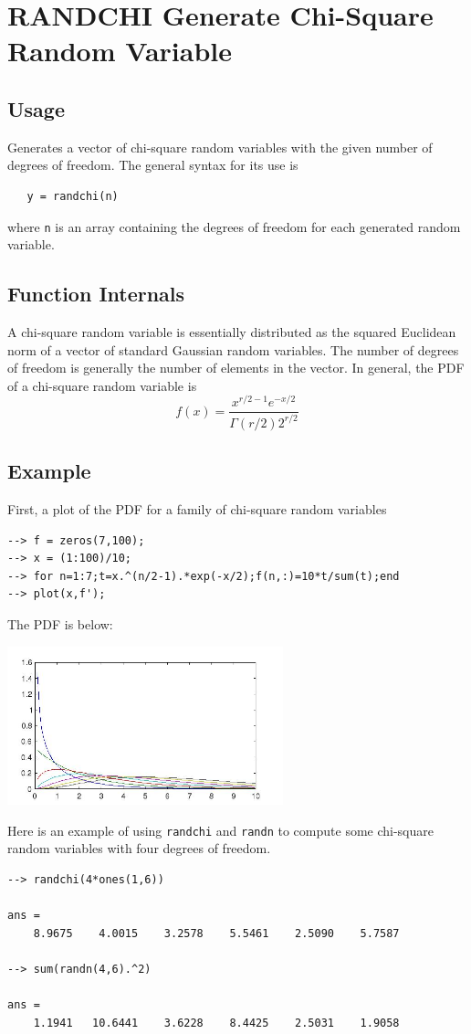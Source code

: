 \section{RANDCHI Generate Chi-Square Random Variable}

\subsection{Usage}

Generates a vector of chi-square random variables with the
given number of degrees of freedom.  The general syntax for
its use is 
\begin{verbatim}
   y = randchi(n)
\end{verbatim}
where \verb|n| is an array containing the degrees of freedom for
each generated random variable.
\subsection{Function Internals}

A chi-square random variable is essentially distributed as
the squared Euclidean norm of a vector of standard Gaussian random 
variables.  The number of degrees of freedom is generally the
number of elements in the vector.  In general, the PDF of
a chi-square random variable is
\[
 f(x) = \frac{x^{r/2-1}e^{-x/2}}{\Gamma(r/2)2^{r/2}}
\]
\subsection{Example}

First, a plot of the PDF for a family of chi-square random variables
\begin{verbatim}
--> f = zeros(7,100);
--> x = (1:100)/10;
--> for n=1:7;t=x.^(n/2-1).*exp(-x/2);f(n,:)=10*t/sum(t);end
--> plot(x,f');
\end{verbatim}
The PDF is below:


\centerline{\includegraphics[width=8cm]{chipdf}}

Here is an example of using \verb|randchi| and \verb|randn| to compute
some chi-square random variables with four degrees of freedom.
\begin{verbatim}
--> randchi(4*ones(1,6))

ans = 
    8.9675    4.0015    3.2578    5.5461    2.5090    5.7587 

--> sum(randn(4,6).^2)

ans = 
    1.1941   10.6441    3.6228    8.4425    2.5031    1.9058 
\end{verbatim}
